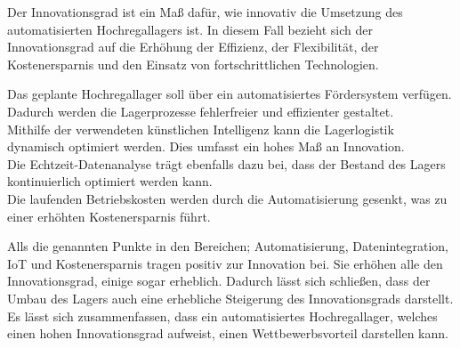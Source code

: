 Der Innovationsgrad ist ein Maß dafür, wie innovativ die Umsetzung des automatisierten Hochregallagers ist.  In diesem Fall bezieht sich der Innovationsgrad auf die Erhöhung der Effizienz, der Flexibilität, der Kostenersparnis und den Einsatz von fortschrittlichen Technologien.

Das geplante Hochregallager soll über ein automatisiertes Fördersystem verfügen. Dadurch werden die Lagerprozesse fehlerfreier und effizienter gestaltet. \\
Mithilfe der verwendeten künstlichen Intelligenz kann die Lagerlogistik dynamisch optimiert werden. Dies umfasst ein hohes Maß an Innovation. \\
Die Echtzeit-Datenanalyse trägt ebenfalls dazu bei, dass der Bestand des Lagers kontinuierlich optimiert werden kann. \\
Die laufenden Betriebskosten werden durch die Automatisierung gesenkt, was zu einer erhöhten Kostenersparnis führt.

Alls die genannten Punkte in den Bereichen; Automatisierung, Datenintegration, IoT und Kostenersparnis tragen positiv zur Innovation bei. Sie erhöhen alle den Innovationsgrad, einige sogar erheblich. Dadurch lässt sich schließen, dass der Umbau des Lagers auch eine erhebliche Steigerung des Innovationsgrads darstellt. Es lässt sich zusammenfassen, dass ein automatisiertes Hochregallager, welches einen hohen Innovationsgrad aufweist, einen Wettbewerbsvorteil darstellen kann.




